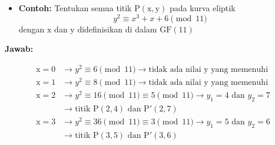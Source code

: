 \documentclass{article}
\begin{document}

\begin{itemize}
    \item \textbf{Contoh:} Tentukan semua titik $\text{P}(\text{x},\text{y})$ pada kurva eliptik
    \[ y^2 \equiv x^3 + x + 6 \pmod{11} \]
    dengan $\text{x}$ dan $\text{y}$ didefinisikan di dalam $\text{GF}(11)$
\end{itemize}

\textbf{Jawab:}

\begin{align*}
    \text{x} = 0 & \rightarrow y^2 \equiv 6 \pmod{11} \rightarrow \text{tidak ada nilai y yang memenuhi} \\
    \text{x} = 1 & \rightarrow y^2 \equiv 8 \pmod{11} \rightarrow \text{tidak ada nilai y yang memenuhi} \\
    \text{x} = 2 & \rightarrow y^2 \equiv 16 \pmod{11} \equiv 5 \pmod{11} \rightarrow y_1 = 4 \text{ dan } y_2 = 7 \\
    & \rightarrow \text{titik } \text{P}(2,4) \text{ dan } \text{P}'(2,7) \\
    \text{x} = 3 & \rightarrow y^2 \equiv 36 \pmod{11} \equiv 3 \pmod{11} \rightarrow y_1 = 5 \text{ dan } y_2 = 6 \\
    & \rightarrow \text{titik } \text{P}(3,5) \text{ dan } \text{P}'(3,6)
\end{align*}
\end{document}
